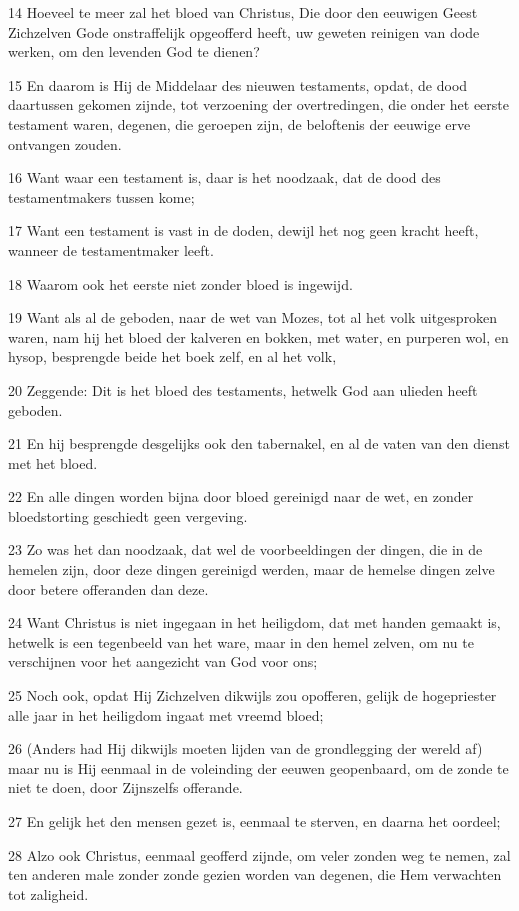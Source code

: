 \par 14 Hoeveel te meer zal het bloed van Christus, Die door den eeuwigen Geest Zichzelven Gode onstraffelijk opgeofferd heeft, uw geweten reinigen van dode werken, om den levenden God te dienen?
\par 15 En daarom is Hij de Middelaar des nieuwen testaments, opdat, de dood daartussen gekomen zijnde, tot verzoening der overtredingen, die onder het eerste testament waren, degenen, die geroepen zijn, de beloftenis der eeuwige erve ontvangen zouden.
\par 16 Want waar een testament is, daar is het noodzaak, dat de dood des testamentmakers tussen kome;
\par 17 Want een testament is vast in de doden, dewijl het nog geen kracht heeft, wanneer de testamentmaker leeft.
\par 18 Waarom ook het eerste niet zonder bloed is ingewijd.
\par 19 Want als al de geboden, naar de wet van Mozes, tot al het volk uitgesproken waren, nam hij het bloed der kalveren en bokken, met water, en purperen wol, en hysop, besprengde beide het boek zelf, en al het volk,
\par 20 Zeggende: Dit is het bloed des testaments, hetwelk God aan ulieden heeft geboden.
\par 21 En hij besprengde desgelijks ook den tabernakel, en al de vaten van den dienst met het bloed.
\par 22 En alle dingen worden bijna door bloed gereinigd naar de wet, en zonder bloedstorting geschiedt geen vergeving.
\par 23 Zo was het dan noodzaak, dat wel de voorbeeldingen der dingen, die in de hemelen zijn, door deze dingen gereinigd werden, maar de hemelse dingen zelve door betere offeranden dan deze.
\par 24 Want Christus is niet ingegaan in het heiligdom, dat met handen gemaakt is, hetwelk is een tegenbeeld van het ware, maar in den hemel zelven, om nu te verschijnen voor het aangezicht van God voor ons;
\par 25 Noch ook, opdat Hij Zichzelven dikwijls zou opofferen, gelijk de hogepriester alle jaar in het heiligdom ingaat met vreemd bloed;
\par 26 (Anders had Hij dikwijls moeten lijden van de grondlegging der wereld af) maar nu is Hij eenmaal in de voleinding der eeuwen geopenbaard, om de zonde te niet te doen, door Zijnszelfs offerande.
\par 27 En gelijk het den mensen gezet is, eenmaal te sterven, en daarna het oordeel;
\par 28 Alzo ook Christus, eenmaal geofferd zijnde, om veler zonden weg te nemen, zal ten anderen male zonder zonde gezien worden van degenen, die Hem verwachten tot zaligheid.

